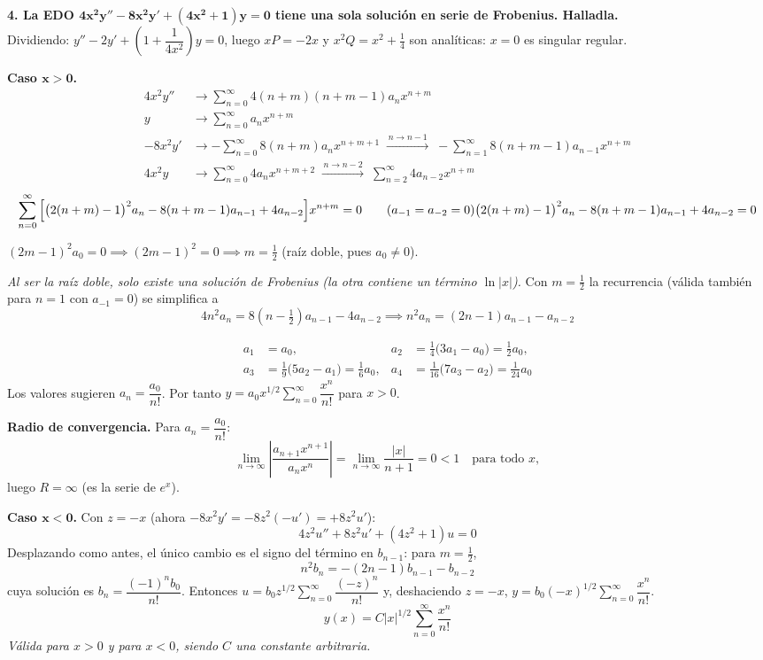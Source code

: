 \documentclass[11pt, a4paper]{article}
\begin{document}
\noindent\textbf{4. La EDO $\bm{4x^2y''-8x^2y'+(4x^2+1)y=0}$ tiene una sola solución en serie de Frobenius. Halladla.} \\
Dividiendo: $y''-2y'+\left(1+\dfrac{1}{4x^2}\right)y=0$, luego $xP=-2x$ y $x^2Q=x^2+\tfrac14$ son analíticas: $x=0$ es singular regular.

\vspace{0.2cm}\noindent\textbf{Caso $\bm{x>0}$.}
\begin{align*}
4x^2y'' &\to \sum_{n=0}^\infty 4(n+m)(n+m-1)a_nx^{n+m} \\
y &\to \sum_{n=0}^\infty a_nx^{n+m} \\
-8x^2y' &\to -\sum_{n=0}^\infty 8(n+m)a_nx^{n+m+1} \;\xrightarrow{\,n\to n-1\,}\; -\sum_{n=1}^\infty 8(n+m-1)a_{n-1}x^{n+m} \\
4x^2y &\to \sum_{n=0}^\infty 4a_nx^{n+m+2} \;\xrightarrow{\,n\to n-2\,}\; \sum_{n=2}^\infty 4a_{n-2}x^{n+m}
\end{align*}
\[
\sum_{n=0}^\infty\Big[\big(2(n+m)-1\big)^2a_n-8(n+m-1)a_{n-1}+4a_{n-2}\Big]x^{n+m}=0 \qquad (a_{-1}=a_{-2}=0)\\
\big(2(n+m)-1\big)^2a_n-8(n+m-1)a_{n-1}+4a_{n-2}=0 
\]

\smallskip\noindent $(2m-1)^2a_0=0 \implies (2m-1)^2=0 \implies m=\tfrac12$ (raíz doble, pues $a_0 \neq 0$).

\textit{Al ser la raíz doble, solo existe una solución de Frobenius (la otra contiene un término $\ln|x|$).} Con $m=\tfrac12$ la recurrencia (válida también para $n=1$ con $a_{-1}=0$) se simplifica a
\[
4n^2a_n=8\left(n-\tfrac12\right)a_{n-1}-4a_{n-2} \implies n^2a_n=(2n-1)a_{n-1}-a_{n-2}
\]

\begin{align*}
a_1&=a_0, & a_2&=\tfrac14\big(3a_1-a_0\big)=\tfrac12a_0, \\
a_3&=\tfrac19\big(5a_2-a_1\big)=\tfrac16a_0, & a_4&=\tfrac1{16}\big(7a_3-a_2\big)=\tfrac1{24}a_0
\end{align*}
Los valores sugieren $a_n=\dfrac{a_0}{n!}$. Por tanto $y=a_0 x^{1/2}\sum_{n=0}^\infty\dfrac{x^n}{n!}$ para $x>0$.

\smallskip\noindent\textbf{Radio de convergencia.} Para $a_n=\dfrac{a_0}{n!}$:
\[
\lim_{n\to\infty}\left|\frac{a_{n+1}x^{n+1}}{a_nx^n}\right|=\lim_{n\to\infty}\frac{|x|}{n+1}=0<1 \quad\text{para todo }x,
\]
luego $R=\infty$ (es la serie de $e^x$).

\vspace{0.2cm}\noindent\textbf{Caso $\bm{x<0}$.} Con $z=-x$ (ahora $-8x^2y'=-8z^2(-u')=+8z^2u'$):
\[
4z^2u''+8z^2u'+(4z^2+1)u=0
\]
Desplazando como antes, el único cambio es el signo del término en $b_{n-1}$: para $m=\tfrac12$,
\[
n^2b_n=-(2n-1)b_{n-1}-b_{n-2}
\]
cuya solución es $b_n=\dfrac{(-1)^n b_0}{n!}$. Entonces $u=b_0 z^{1/2}\sum_{n=0}^\infty \dfrac{(-z)^n}{n!}$ y, deshaciendo $z=-x$, $y=b_0(-x)^{1/2}\sum_{n=0}^\infty \dfrac{x^n}{n!}$.
\[
\boxed{y(x)= C |x|^{1/2}\sum_{n=0}^\infty\frac{x^n}{n!}}
\]
\textit{Válida para $x>0$ y para $x<0$, siendo $C$ una constante arbitraria.}\\
\end{document}

